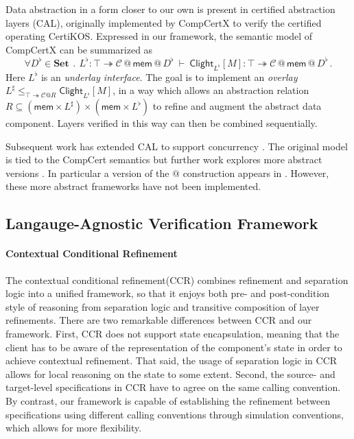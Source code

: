 \documentclass[acmsmall,screen,review,anonymous]{acmart}
\newcommand{\kw}[1]{\ensuremath{ \mathsf{#1} }}
\begin{document}
Data abstraction in a form closer to our own
is present in certified abstraction layers (CAL),
originally implemented by CompCertX \cite{popl15}
to verify the certified operating CertiKOS.
Expressed in our framework,
the semantic model of CompCertX can be summarized as
\[
  \forall D^\flat \in \mathbf{Set}
  \: \mathbin. \:
  L^\flat :
    \top \twoheadrightarrow
    \mathcal{C} \mathbin@ \kw{mem} \mathbin@ D^\flat
  \: \vdash \:
  \kw{Clight}_{L^\flat}[M] :
    \top \twoheadrightarrow
    \mathcal{C} \mathbin@ \kw{mem} \mathbin@ D^\flat
  \,.
\]
Here $L^\flat$ is an \emph{underlay interface}.
The goal is to implement an \emph{overlay}
$
  L^\sharp \le_{\top \twoheadrightarrow \mathcal{C}@R}
    \kw{Clight}_{L^\flat}[M]
$,
in a way which allows an abstraction relation
$R \subseteq (\kw{mem} \times L^\sharp) \times (\kw{mem} \times L^\flat)$
to refine and augment the abstract data component.
Layers verified in this way can then be combined sequentially.

Subsequent work has extended CAL to support concurrency \cite{ccal}.
The original model is tied to the CompCert semantics but
further work explores more abstract versions \cite{rbgs-cal,popl22}.
In particular a version of the $\mathbin@$ construction appears in \citet{rbgs-cal}.
However, these more abstract frameworks
have not been implemented.

\subsection{Langauge-Agnostic Verification Framework}

\paragraph{Contextual Conditional Refinement}

The contextual conditional refinement(CCR)\cite{ccr}
combines refinement and separation logic
into a unified framework,
so that it enjoys both
pre- and post-condition style of reasoning from separation logic
and transitive composition of layer refinements.
There are two remarkable differences between CCR and our framework.
First, CCR does not support state encapsulation,
meaning that the client has to be aware of
the representation of the component's state
in order to achieve contextual refinement.
That said, the usage of separation logic in CCR
allows for local reasoning on the state to some extent.
Second, the source- and target-level specifications
in CCR have to agree on the same calling convention.
By contrast,
our framework is capable of
establishing the refinement between
specifications using different calling conventions
through simulation conventions,
which allows for more flexibility.
\end{document}
